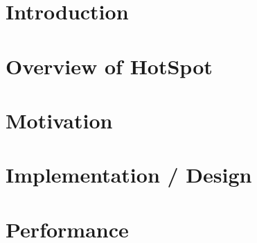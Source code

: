 \documentclass[11pt,a4paper]{book}
\begin{document}
\nocite{*}

\frontmatter


\chapter*{Introduction}
\label{c:Introduction}




\tableofcontents

\mainmatter
\chapter{Overview of HotSpot}
\label{c:overview}


\chapter{Motivation}
\label{c:motivation}


\chapter{Implementation / Design}
\label{c:implementation}


\chapter{Performance}
\label{c:performance}

\end{document}

